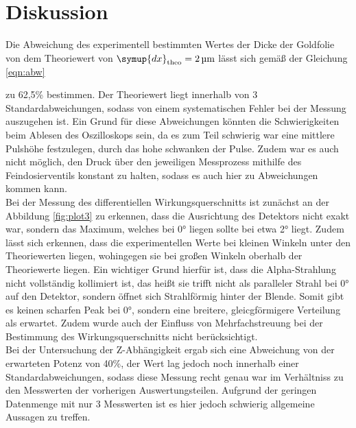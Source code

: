 \section{Diskussion}
\label{sec:Diskussion}
Die Abweichung des experimentell bestimmten Wertes der Dicke der Goldfolie von dem
Theoriewert von $\symup{dx}_{\text{theo}}=\SI{2}{\micro\meter}$
lässt sich gemäß der Gleichung \ref{eqn:abw}

zu 62,5\% bestimmen. Der Theoriewert liegt innerhalb von 3 Standardabweichungen,
sodass von einem systematischen Fehler bei der Messung auszugehen ist. Ein Grund für diese
Abweichungen könnten die Schwierigkeiten beim Ablesen des Oszilloskops sein, da es zum Teil
schwierig war eine mittlere Pulshöhe festzulegen, durch das hohe schwanken der
Pulse. Zudem war es auch nicht möglich, den Druck über den jeweiligen Messprozess mithilfe
des Feindosierventils konstant zu halten, sodass es auch hier zu Abweichungen kommen kann.
\\
Bei der Messung des differentiellen Wirkungsquerschnitts ist zunächst an der Abbildung
\ref{fig:plot3} zu erkennen, dass die Ausrichtung des Detektors nicht exakt war, sondern das
Maximum, welches bei 0° liegen sollte bei etwa 2° liegt. Zudem lässt sich erkennen,
dass die experimentellen Werte bei kleinen Winkeln unter den Theoriewerten liegen, wohingegen
sie bei großen Winkeln oberhalb der Theoriewerte liegen. Ein wichtiger Grund hierfür ist, dass die Alpha-Strahlung
nicht vollständig kollimiert ist, das heißt sie trifft nicht als paralleler Strahl bei 0° auf den Detektor,
sondern öffnet sich Strahlförmig hinter der Blende. Somit gibt es keinen scharfen Peak bei 0°,
sondern eine breitere, gleicgförmigere Verteilung als erwartet. Zudem wurde auch der Einfluss
von Mehrfachstreuung bei der Bestimmung des Wirkungsquerschnitts nicht berücksichtigt. \\
Bei der Untersuchung der Z-Abhängigkeit ergab sich eine Abweichung von der erwarteten
Potenz von 40\%, der Wert lag jedoch noch innerhalb einer Standardabweichungen, sodass diese Messung recht
genau war im Verhältniss zu den Messwerten der vorherigen Auswertungsteilen. Aufgrund der geringen Datenmenge mit nur 3
Messwerten ist es hier jedoch schwierig allgemeine Aussagen zu treffen. 
